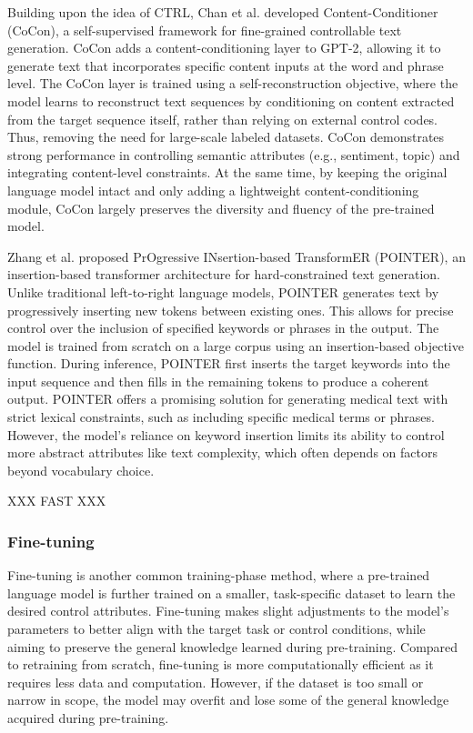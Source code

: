 Building upon the idea of CTRL, Chan et al. \cite{chan2022coconselfsupervisedapproachcontrolled} developed Content-Conditioner (CoCon), a self-supervised framework for fine-grained controllable text generation. 
CoCon adds a content-conditioning layer to GPT-2, allowing it to generate text that incorporates specific content inputs at the word and phrase level. 
The CoCon layer is trained using a self-reconstruction objective, where the model learns to reconstruct text sequences by conditioning on content extracted from the target sequence itself, rather than relying on external control codes.
Thus, removing the need for large-scale labeled datasets.
CoCon demonstrates strong performance in controlling semantic attributes (e.g., sentiment, topic) and integrating content-level constraints.
At the same time, by keeping the original language model intact and only adding a lightweight content-conditioning module, CoCon largely preserves the diversity and fluency of the pre-trained model.

Zhang et al. \cite{zhang-etal-2020-pointer} proposed PrOgressive INsertion-based TransformER (POINTER), an insertion-based transformer architecture for hard-constrained text generation.
Unlike traditional left-to-right language models, POINTER generates text by progressively inserting new tokens between existing ones. 
This allows for precise control over the inclusion of specified keywords or phrases in the output. 
The model is trained from scratch on a large corpus using an insertion-based objective function. 
During inference, POINTER first inserts the target keywords into the input sequence and then fills in the remaining tokens to produce a coherent output.
POINTER offers a promising solution for generating medical text with strict lexical constraints, such as including specific medical terms or phrases. 
However, the model's reliance on keyword insertion limits its ability to control more abstract attributes like text complexity, which often depends on factors beyond vocabulary choice.

XXX 
FAST
XXX

\subsubsection{Fine-tuning}
Fine-tuning is another common training-phase method, where a pre-trained language model is further trained on a smaller, task-specific dataset to learn the desired control attributes. 
Fine-tuning makes slight adjustments to the model's parameters to better align with the target task or control conditions, while aiming to preserve the general knowledge learned during pre-training. 
Compared to retraining from scratch, fine-tuning is more computationally efficient as it requires less data and computation.
However, if the dataset is too small or narrow in scope, the model may overfit and lose some of the general knowledge acquired during pre-training.

